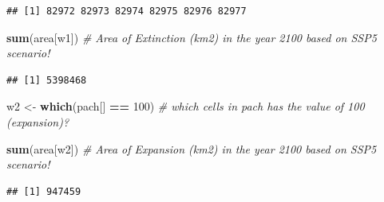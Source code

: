 \documentclass[
]{article}
\newenvironment{Shaded}{\begin{snugshade}}{\end{snugshade}}
\newcommand{\CommentTok}[1]{\textcolor[rgb]{0.56,0.35,0.01}{\textit{#1}}}
\newcommand{\DecValTok}[1]{\textcolor[rgb]{0.00,0.00,0.81}{#1}}
\newcommand{\FunctionTok}[1]{\textcolor[rgb]{0.13,0.29,0.53}{\textbf{#1}}}
\newcommand{\NormalTok}[1]{#1}
\newcommand{\OtherTok}[1]{\textcolor[rgb]{0.56,0.35,0.01}{#1}}
\newcommand{\SpecialCharTok}[1]{\textcolor[rgb]{0.81,0.36,0.00}{\textbf{#1}}}
\begin{document}
\begin{verbatim}
## [1] 82972 82973 82974 82975 82976 82977
\end{verbatim}

\begin{Shaded}
\begin{Highlighting}[]
\FunctionTok{sum}\NormalTok{(area[w1]) }\CommentTok{\# Area of Extinction (km2) in the year 2100 based on SSP5 scenario!}
\end{Highlighting}
\end{Shaded}

\begin{verbatim}
## [1] 5398468
\end{verbatim}

\begin{Shaded}
\begin{Highlighting}[]
\NormalTok{w2 }\OtherTok{\textless{}{-}} \FunctionTok{which}\NormalTok{(pach[] }\SpecialCharTok{==} \DecValTok{100}\NormalTok{) }\CommentTok{\# which cells in pach has the value of 100 (expansion)?}

\FunctionTok{sum}\NormalTok{(area[w2]) }\CommentTok{\# Area of Expansion (km2) in the year 2100 based on SSP5 scenario!}
\end{Highlighting}
\end{Shaded}

\begin{verbatim}
## [1] 947459
\end{verbatim}
\end{document}
